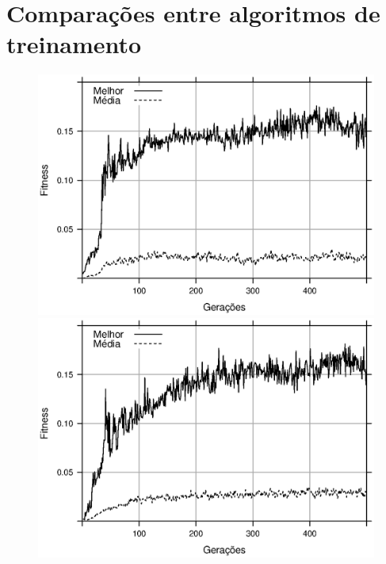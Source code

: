 \section{Comparações entre algoritmos de treinamento}

\begin{figure}[H]
    \centering
    \begin{minipage}{.47\textwidth}
        \includegraphics[width=\textwidth]{figures/fitness-GA}
    \end{minipage}%
    \begin{minipage}{.47\textwidth}
        \includegraphics[width=\textwidth]{figures/fitness-PGA}
    \end{minipage}


\end{figure}
